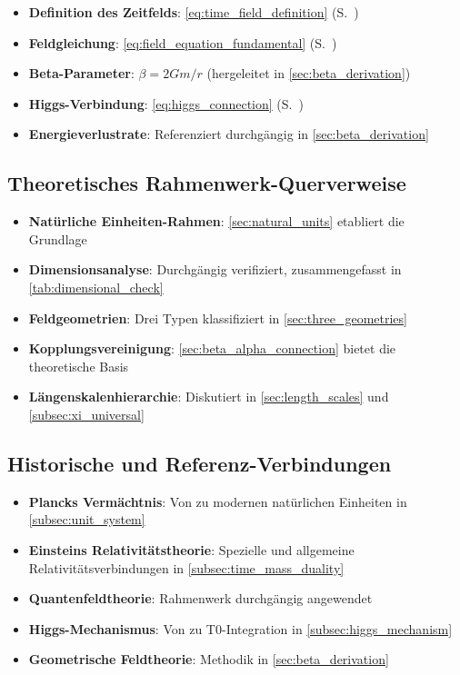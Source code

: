 \documentclass[12pt,a4paper]{article}
\begin{document}
	\begin{itemize}
		\item \textbf{Definition des Zeitfelds}: \cref{eq:time_field_definition} (S.~\pageref{eq:time_field_definition})
		\item \textbf{Feldgleichung}: \cref{eq:field_equation_fundamental} (S.~\pageref{eq:field_equation_fundamental})
		\item \textbf{Beta-Parameter}: $\beta = 2Gm/r$ (hergeleitet in \cref{sec:beta_derivation})
		\item \textbf{Higgs-Verbindung}: \cref{eq:higgs_connection} (S.~\pageref{eq:higgs_connection})
		\item \textbf{Energieverlustrate}: Referenziert durchgängig in \cref{sec:beta_derivation}
	\end{itemize}
	
	\subsection{Theoretisches Rahmenwerk-Querverweise}
	\label{app:theoretical_framework}
	
	\begin{itemize}
		\item \textbf{Natürliche Einheiten-Rahmen}: \cref{sec:natural_units} etabliert die Grundlage
		\item \textbf{Dimensionsanalyse}: Durchgängig verifiziert, zusammengefasst in \cref{tab:dimensional_check}
		\item \textbf{Feldgeometrien}: Drei Typen klassifiziert in \cref{sec:three_geometries}
		\item \textbf{Kopplungsvereinigung}: \cref{sec:beta_alpha_connection} bietet die theoretische Basis
		\item \textbf{Längenskalenhierarchie}: Diskutiert in \cref{sec:length_scales} und \cref{subsec:xi_universal}
	\end{itemize}
	
	\subsection{Historische und Referenz-Verbindungen}
	\label{app:historical_connections}
	
	\begin{itemize}
		\item \textbf{Plancks Vermächtnis}: Von \citet{planck1900,planck1906} zu modernen natürlichen Einheiten in \cref{subsec:unit_system}
		\item \textbf{Einsteins Relativitätstheorie}: Spezielle \citep{einstein1905} und allgemeine \citep{einstein1915} Relativitätsverbindungen in \cref{subsec:time_mass_duality}
		\item \textbf{Quantenfeldtheorie}: \citet{weinberg1995,peskin1995} Rahmenwerk durchgängig angewendet
		\item \textbf{Higgs-Mechanismus}: Von \citet{higgs1964,englert1964} zu T0-Integration in \cref{subsec:higgs_mechanism}
		\item \textbf{Geometrische Feldtheorie}: \citet{misner1973} Methodik in \cref{sec:beta_derivation}
	\end{itemize}
	
\end{document}
